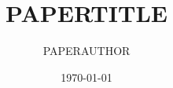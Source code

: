 \documentclass[reprint, aps, prd, nofootinbib]{revtex4-2}  %
\begin{document}
\title{PAPERTITLE}

\author{PAPERAUTHOR}

\date{\today}

\begin{abstract}

\end{abstract}

\maketitle


\end{document}
